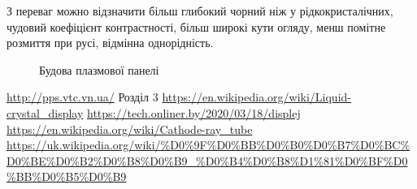 \documentclass[a4paper]{article}
\begin{document}
З переваг можно відзначити більш глибокий чорний ніж у рідкокристалічних, чудовий коефіцієнт контрастності, більш широкі кути огляду, менш помітне розмиття при русі, відмінна однорідність.

\begin{figure}[ht]
\caption{Будова плазмової панелі}
\end{figure}



\begin{thebibliography}{4}
{\small
{} \url{http://pps.vtc.vn.ua/} Розділ 3
}
{\small
{} \url{https://en.wikipedia.org/wiki/Liquid-crystal_display}
}
{\small
{} \url{https://tech.onliner.by/2020/03/18/displej}
}
{\small
{} \url{https://en.wikipedia.org/wiki/Cathode-ray_tube}
}
{\small
{} \url{https://uk.wikipedia.org/wiki/%D0%9F%D0%BB%D0%B0%D0%B7%D0%BC%D0%BE%D0%B2%D0%B8%D0%B9_%D0%B4%D0%B8%D1%81%D0%BF%D0%BB%D0%B5%D0%B9}
}
\end{thebibliography}
\end{document}
